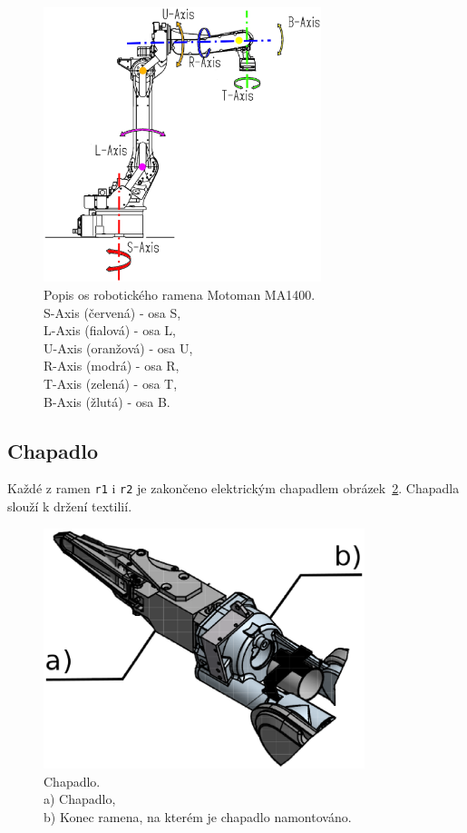 \documentclass[10pt,a4paper,titlepage,oneside]{report}
\begin{document}
\begin{figure}[H]
	\centering  	
  	\includegraphics[height=8cm]{pictures/motomanMA1400axis.eps}
  	\caption[]{Popis os robotického ramena Motoman MA1400.\\ 
  	S-Axis (červená) - osa S,\\ L-Axis (fialová) - osa L,\\ U-Axis (oranžová) - osa U,\\ R-Axis (modrá) - osa R,\\ T-Axis (zelená) - osa T,\\ B-Axis (žlutá) - osa B.}
  	\label{fig:motomanAxis}
\end{figure}

\subsection{Chapadlo}
\label{subsec:gripper}
Každé z ramen \verb|r1| i \verb|r2| je zakončeno elektrickým chapadlem obrázek~\ref{fig:gripper}. Chapadla slouží k držení textilií.

\begin{figure}[H]
	\centering  	
  	\includegraphics[height=7cm]{pictures/gripper.eps}
  	\caption[]{Chapadlo.\\a) Chapadlo,\\b) Konec ramena, na kterém je chapadlo namontováno.	  	
  	}
  	\label{fig:gripper}
\end{figure}
\end{document}
